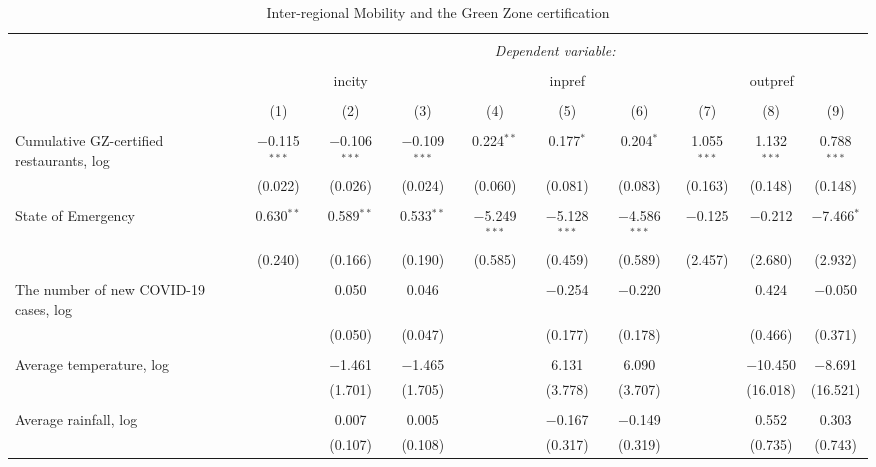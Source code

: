 
\begin{sidewaystable}[!htbp] \centering 
  \caption{Inter-regional Mobility and the Green Zone certification} 
  \label{} 
\footnotesize 
\begin{tabular}{@{\extracolsep{1pt}}lccccccccc} 
\\[-1.8ex]\hline 
\hline \\[-1.8ex] 
 & \multicolumn{9}{c}{\textit{Dependent variable:}} \\ 
\cline{2-10} 
\\[-1.8ex] & \multicolumn{3}{c}{incity} & \multicolumn{3}{c}{inpref} & \multicolumn{3}{c}{outpref} \\ 
\\[-1.8ex] & (1) & (2) & (3) & (4) & (5) & (6) & (7) & (8) & (9)\\ 
\hline \\[-1.8ex] 
 Cumulative GZ-certified restaurants, log & $-$0.115$^{***}$ & $-$0.106$^{***}$ & $-$0.109$^{***}$ & 0.224$^{**}$ & 0.177$^{*}$ & 0.204$^{*}$ & 1.055$^{***}$ & 1.132$^{***}$ & 0.788$^{***}$ \\ 
  & (0.022) & (0.026) & (0.024) & (0.060) & (0.081) & (0.083) & (0.163) & (0.148) & (0.148) \\ 
  & & & & & & & & & \\ 
 State of Emergency & 0.630$^{**}$ & 0.589$^{**}$ & 0.533$^{**}$ & $-$5.249$^{***}$ & $-$5.128$^{***}$ & $-$4.586$^{***}$ & $-$0.125 & $-$0.212 & $-$7.466$^{*}$ \\ 
  & (0.240) & (0.166) & (0.190) & (0.585) & (0.459) & (0.589) & (2.457) & (2.680) & (2.932) \\ 
  & & & & & & & & & \\ 
 The number of new COVID-19 cases, log &  & 0.050 & 0.046 &  & $-$0.254 & $-$0.220 &  & 0.424 & $-$0.050 \\ 
  &  & (0.050) & (0.047) &  & (0.177) & (0.178) &  & (0.466) & (0.371) \\ 
  & & & & & & & & & \\ 
 Average temperature, log &  & $-$1.461 & $-$1.465 &  & 6.131 & 6.090 &  & $-$10.450 & $-$8.691 \\ 
  &  & (1.701) & (1.705) &  & (3.778) & (3.707) &  & (16.018) & (16.521) \\ 
  & & & & & & & & & \\ 
 Average rainfall, log &  & 0.007 & 0.005 &  & $-$0.167 & $-$0.149 &  & 0.552 & 0.303 \\ 
  &  & (0.107) & (0.108) &  & (0.317) & (0.319) &  & (0.735) & (0.743) \\ 

\end{tabular}
\end{sidewaystable}
